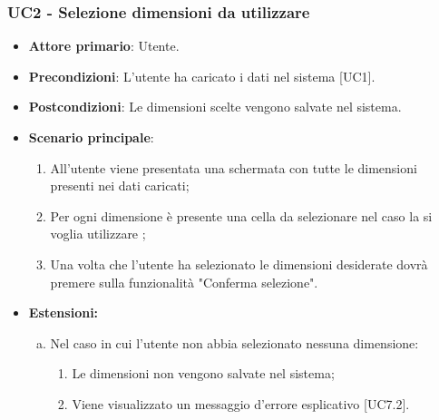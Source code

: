 \subsubsection{UC2 - Selezione dimensioni da utilizzare}
\begin{itemize}
	\item \textbf{Attore primario}: Utente.
	\item \textbf{Precondizioni}: L'utente ha caricato i dati nel sistema [UC1].
	\item \textbf{Postcondizioni}: Le dimensioni scelte vengono salvate nel sistema.
	\item \textbf{Scenario principale}:
		\begin{enumerate}
			\item All'utente viene presentata una schermata con tutte le dimensioni presenti nei dati caricati;
			\item Per ogni dimensione è presente una cella da selezionare nel caso la si voglia utilizzare ;
			\item Una volta che l'utente ha selezionato le dimensioni desiderate dovrà premere sulla funzionalità "Conferma selezione".
		\end{enumerate}
	\item \textbf{Estensioni:}
		\begin{enumerate}[(a)]
			\item Nel caso in cui l'utente non abbia selezionato nessuna dimensione:
			\begin{enumerate}[1.]
				\item Le dimensioni non vengono salvate nel sistema;
				\item Viene visualizzato un messaggio d'errore esplicativo [UC7.2].
			\end{enumerate}
		\end{enumerate}
\end{itemize}
